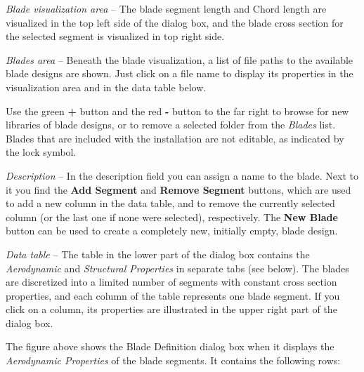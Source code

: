 \begin{bulletlist}
\item{\sl Blade visualization area} --
  The blade segment length and Chord length are visualized in the top left side
  of the dialog box, and the blade cross section for the selected segment
  is visualized in top right side.

\item{\sl Blades area} --
  Beneath the blade visualization, a list of file paths to the available blade
  designs are shown. Just click on a file name to display its properties in the
  visualization area and in the data table below.

  Use the green \textbf{+} button and the red \textbf{-} button to the far right
  to browse for new libraries of blade designs, or to remove a selected folder
  from the {\sl Blades} list. Blades that are included with the installation are
  not editable, as indicated by the lock symbol.

\item{\sl Description} --
  In the description field you can assign a name to the blade.
  Next to it you find the \textbf{Add Segment} and \textbf{Remove Segment}
  buttons, which are used to add a new column in the data table,
  and to remove the currently selected column (or the last one if none were
  selected), respectively.
  The \textbf{New Blade} button can be used to create a completely new,
  initially empty, blade design.

\item{\sl Data table} --
  The table in the lower part of the dialog box contains the {\sl Aerodynamic}
  and {\sl Structural Properties} in separate tabs (see below).
  The blades are discretized into a limited number of segments with constant
  cross section properties, and each column of the table represents one
  blade segment. If you click on a column, its properties are illustrated
  in the upper right part of the dialog box.
\end{bulletlist}

The figure above shows the Blade Definition dialog box when it displays the
{\sl Aerodynamic Properties} of the blade segments.
It contains the following rows:

